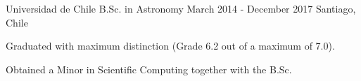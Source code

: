 \begin{cventries}
  \cventry
    {Universidad de Chile} %
    {B.Sc. in Astronomy} %
    {March 2014 - December 2017} %
     {Santiago, Chile} %
    {
      \begin{cvitems} %
      \item {Graduated with maximum distinction (Grade 6.2 out of a maximum of 7.0).}
      \item{Obtained a Minor in Scientific Computing together with the B.Sc.}
      \end{cvitems}
    }

\end{cventries}
